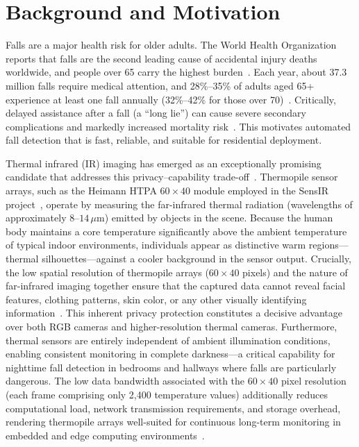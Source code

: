 \section{Background and Motivation}
\label{sec:intro_background}

Falls are a major health risk for older adults. The World Health Organization reports that falls are the second leading cause of accidental injury deaths worldwide, and people over 65 carry the highest burden~\cite{who2007falls}. Each year, about 37.3 million falls require medical attention, and 28\%--35\% of adults aged 65+ experience at least one fall annually (32\%--42\% for those over 70)~\cite{tinetti1988risk,lord2007falls}. Critically, delayed assistance after a fall (a ``long lie'') can cause severe secondary complications and markedly increased mortality risk~\cite{wild2004unintentional,Fleming2008inability}. This motivates automated fall detection that is fast, reliable, and suitable for residential deployment.


Thermal infrared (IR) imaging has emerged as an exceptionally promising candidate that addresses this privacy--capability trade-off~\cite{vadivelu2016thermal, nogas2020fall}. Thermopile sensor arrays, such as the Heimann HTPA $60 \times 40$ module employed in the SensIR project~\cite{heimann2024htpa}, operate by measuring the far-infrared thermal radiation (wavelengths of approximately $8$--$14\,\mu$m) emitted by objects in the scene. Because the human body maintains a core temperature significantly above the ambient temperature of typical indoor environments, individuals appear as distinctive warm regions---thermal silhouettes---against a cooler background in the sensor output. Crucially, the low spatial resolution of thermopile arrays ($60 \times 40$ pixels) and the nature of far-infrared imaging together ensure that the captured data cannot reveal facial features, clothing patterns, skin color, or any other visually identifying information~\cite{mashiyama2015activity, tao2018real}. This inherent privacy protection constitutes a decisive advantage over both RGB cameras and higher-resolution thermal cameras. Furthermore, thermal sensors are entirely independent of ambient illumination conditions, enabling consistent monitoring in complete darkness---a critical capability for nighttime fall detection in bedrooms and hallways where falls are particularly dangerous. The low data bandwidth associated with the $60 \times 40$ pixel resolution (each frame comprising only 2,400 temperature values) additionally reduces computational load, network transmission requirements, and storage overhead, rendering thermopile arrays well-suited for continuous long-term monitoring in embedded and edge computing environments~\cite{heimann2024htpa}.

